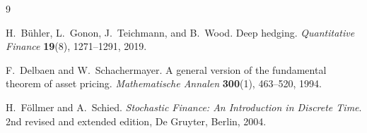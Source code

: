 \documentclass[11pt,a4paper]{report}
\numberwithin{equation}{chapter}
\theoremstyle{plain}
\theoremstyle{definition}
\begin{document}
\begin{thebibliography}{9}

    H.~B\"uhler, L.~Gonon, J.~Teichmann, and B.~Wood.
    Deep hedging.
    \emph{Quantitative Finance} \textbf{19}(8), 1271--1291, 2019.

    F.~Delbaen and W.~Schachermayer.
    A general version of the fundamental theorem of asset pricing.
    \emph{Mathematische Annalen} \textbf{300}(1), 463--520, 1994.

    H.~F\"ollmer and A.~Schied.
    \emph{Stochastic Finance: An Introduction in Discrete Time}.
    2nd revised and extended edition, De Gruyter, Berlin, 2004.

\end{thebibliography}
\end{document}
